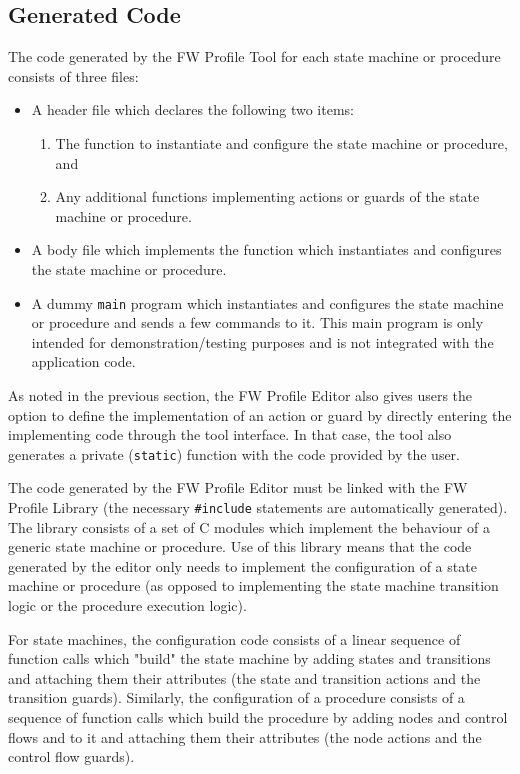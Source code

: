 \documentclass{pnp_article}
\begin{document}
\subsection{Generated Code}
The code generated by the FW Profile Tool for each state machine or procedure consists of three files:

\begin{itemize}
\item A header file which declares the following two items: 
\begin{enumerate}
\item The function to instantiate and configure the state machine or procedure, and
\item Any additional functions implementing actions or guards of the state machine or procedure. 
\end{enumerate}
\item A body file which implements the function which instantiates and configures the state machine or procedure.
\item A dummy \texttt{main} program which instantiates and configures the state machine or procedure and sends a few commands to it. This main program is only intended for demonstration/testing purposes and is not integrated with the application code. 
\end{itemize}

As noted in the previous section, the FW Profile Editor also gives users the option to define the implementation of an action or guard by directly entering the implementing code through the tool interface. In that case, the tool also generates a private (\texttt{static}) function with the code provided by the user. 

The code generated by the FW Profile Editor must be linked with the FW Profile Library (the necessary \texttt{\#include} statements are automatically generated). The library consists of a set of C modules which implement the behaviour of a generic state machine or procedure. Use of this library means that the code generated by the editor only needs to implement the configuration of a state machine or procedure (as opposed to implementing the state machine transition logic or the procedure execution logic). 

For state machines, the configuration code consists of a linear sequence of function calls which "build" the state machine by adding states and transitions and attaching them their attributes (the state and transition actions and the transition guards). Similarly, the configuration of a procedure consists of a sequence of function calls which build the procedure by adding nodes and control flows and to it and attaching them their attributes (the node actions and the control flow guards). 
\end{document}
